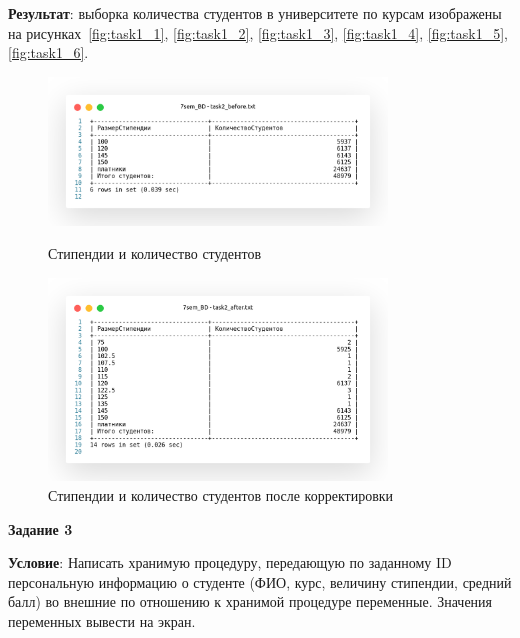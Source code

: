 

\textbf{Результат}: выборка количества студентов в университете по курсам изображены на рисунках~\ref{fig:task1_1},
\ref{fig:task1_2}, \ref{fig:task1_3}, \ref{fig:task1_4}, \ref{fig:task1_5}, \ref{fig:task1_6}.

\begin{figure}[!h]
  \centering

  \begin{minipage}{0.49\textwidth}
    \centering

    \includegraphics[width=9cm]
    {../sql/task2/task2_before.png}

    \caption{Стипендии и количество студентов}
    \label{fig:task2_1}
  \end{minipage}
  \begin{minipage}{0.49\textwidth}
    \centering

    \includegraphics[width=9cm]
    {../sql/task2/task2_after.png}

    \caption{Стипендии и количество студентов после корректировки}
    \label{fig:task2_2}
  \end{minipage}
\end{figure}

\begin{center}
  \textbf{Задание 3}
\end{center}

\textbf{Условие}:
Написать хранимую процедуру, передающую по заданному ID персональную информацию о студенте
(ФИО, курс, величину стипендии, средний балл) во внешние по отношению к хранимой процедуре переменные.
Значения переменных вывести на экран.

